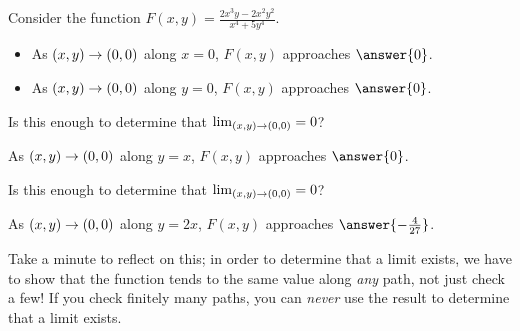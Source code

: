 \documentclass{ximera}
\author{Jim Talamo}
\begin{document}
\begin{exercise}
  Consider the function $F(x,y)= \frac{2x^3y-2x^2y^2}{x^4+5y^4}$.
  
  \begin{itemize}
  \item As $\left(x,y\right) \to \left(0,0\right)$ along $x=0$, $F(x,y)$ approaches $\answer{0}$.
  \item As $\left(x,y\right) \to \left(0,0\right)$ along $y=0$, $F(x,y)$ approaches $\answer{0}$.
  \end{itemize}
  
   Is this enough to determine that $\lim_{\left(x,y\right) \to \left(0,0\right)} = 0$? 
   
   \begin{exercise}
   As $\left(x,y\right) \to \left(0,0\right)$ along $y=x$, $F(x,y)$ approaches $\answer{0}$.
   
  Is this enough to determine that $\lim_{\left(x,y\right) \to \left(0,0\right)} = 0$? 
      
  \begin{exercise}
     As $\left(x,y\right) \to \left(0,0\right)$ along $y=2x$, $F(x,y)$ approaches $\answer{-\frac{4}{27}}$.

\begin{multipleChoice}
\end{multipleChoice}

\begin{feedback}[correct]
Take a minute to reflect on this; in order to determine that a limit exists, we have to show that the function tends to the same value along \emph{any} path, not just check a few!  If you check finitely many paths, you can \emph{never} use the result to determine that a limit exists.   
\end{feedback}
   \end{exercise}
   \end{exercise}
   \end{exercise}
\end{document}
